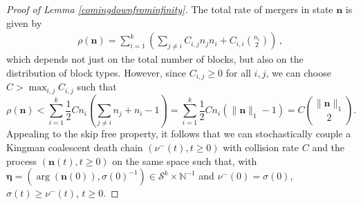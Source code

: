 \documentclass[12pt, leqno]{article}
\newcommand*{\norm}[1]{\lVert #1 \rVert}
\begin{document}
\begin{proof}[Proof of Lemma \ref{comingdownfrominfinity}]
The total rate of mergers in state $\bm{n}$ is given by 
\begin{align}\label{rates}
\rho(\bm{n})=\sum_{i=1}^k\left(\sum_{j\neq i}C_{i,j}n_{j}n_i +C_{i,i} {n_i \choose 2}
\right)\,,
\end{align}
which depends not just on the total number of blocks, but also on the distribution of block types. However, since $C_{i,j}\geq0$  for all $i,j$, 
we can choose $C> \max_{i,j}C_{i,j}$ such that
\begin{equation}
\rho(\bm{n})
<
\sum_{i=1}^k\frac{1}{2}Cn_i\left(\sum_{j\neq i}n_{j} +  n_i-1\right) = 
\sum_{i=1}^k\frac{1}{2}Cn_i(\norm{\bm n}_1-1) = {C} {\norm{\bm n}_1 \choose 2}.
%
%
\label{rhoupper}
\end{equation}
Appealing to the skip free property, it follows that we can stochastically couple a Kingman coalescent death chain $(\nu^{-}(t), t\geq0)$ with collision rate $C$ and the process $({\bm n}(t), t\geq 0)$ on the same space such that, with  ${\bm \eta} = (\arg({\bm n}(0)), \sigma(0)^{-1})\in \mathcal{S}^k\times \mathbb{N}^{-1}$ and $\nu^-(0) = \sigma(0)$, $\sigma(t)\geq \nu^-(t)$, $t\geq0$.

\medskip



\end{proof}
\end{document}
